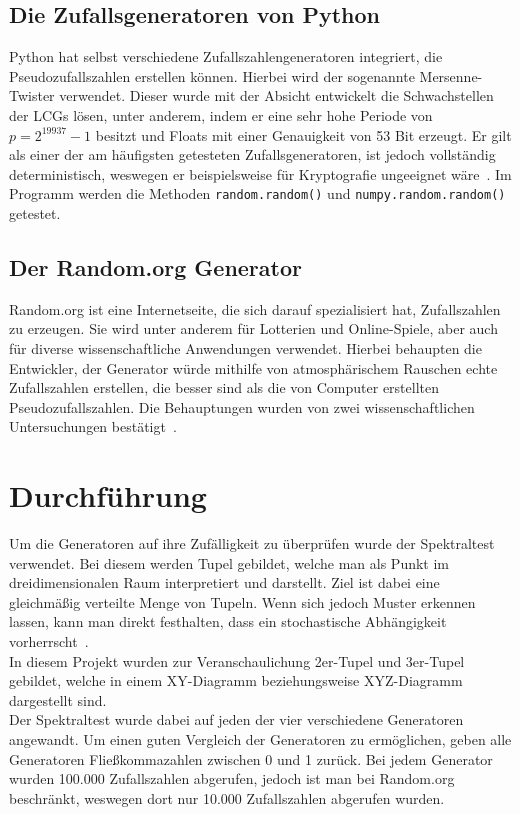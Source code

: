 \documentclass[12pt]{article}
\begin{document}
    \subsection{Die Zufallsgeneratoren von Python}\label{subsec:die-zufallsgeneratoren-von-python}
    Python hat selbst verschiedene Zufallszahlengeneratoren integriert, die Pseudozufallszahlen erstellen können.
    Hierbei wird der sogenannte Mersenne-Twister verwendet.
    Dieser wurde mit der Absicht entwickelt die Schwachstellen der LCGs lösen, unter anderem,
    indem er eine sehr hohe Periode von $p=2^{19937}-1$ besitzt und Floats mit einer Genauigkeit von 53 Bit erzeugt.
    Er gilt als einer der am häufigsten getesteten Zufallsgeneratoren, ist jedoch vollständig deterministisch,
    weswegen er beispielsweise für Kryptografie ungeeignet wäre~\cite{python-random,mersenne-twister}.
    Im Programm werden die Methoden \texttt{random.random()} und \texttt{numpy.random.random()} getestet.

    \vfill

    \subsection{Der Random.org Generator}\label{subsec:der-random.org-generator}
    Random.org ist eine Internetseite, die sich darauf spezialisiert hat, Zufallszahlen zu erzeugen.
    Sie wird unter anderem für Lotterien und Online-Spiele, aber auch für diverse wissenschaftliche
    Anwendungen verwendet.
    Hierbei behaupten die Entwickler, der Generator würde mithilfe von atmosphärischem Rauschen echte Zufallszahlen erstellen,
    die besser sind als die von Computer erstellten Pseudozufallszahlen.
    Die Behauptungen wurden von zwei wissenschaftlichen Untersuchungen bestätigt~\cite{random-org}.

    \vfill

    \section{Durchführung}\label{sec:Durchfuehrung}
    Um die Generatoren auf ihre Zufälligkeit zu überprüfen wurde der Spektraltest verwendet.
    Bei diesem werden Tupel gebildet, welche man als Punkt im dreidimensionalen Raum interpretiert und darstellt.
    Ziel ist dabei eine gleichmäßig verteilte Menge von Tupeln.
    Wenn sich jedoch Muster erkennen lassen, kann man direkt festhalten, dass ein stochastische Abhängigkeit vorherrscht~\cite{spektraltest}.
    \\
    In diesem Projekt wurden zur Veranschaulichung 2er-Tupel und 3er-Tupel gebildet,
    welche in einem XY-Diagramm beziehungsweise XYZ-Diagramm dargestellt sind.
    \\
    Der Spektraltest wurde dabei auf jeden der vier verschiedene Generatoren angewandt.
    Um einen guten Vergleich der Generatoren zu ermöglichen, geben alle Generatoren Fließkommazahlen zwischen 0 und 1 zurück.
    Bei jedem Generator wurden 100.000 Zufallszahlen abgerufen, jedoch ist man bei Random.org beschränkt,
    weswegen dort nur 10.000 Zufallszahlen abgerufen wurden.
\end{document}
